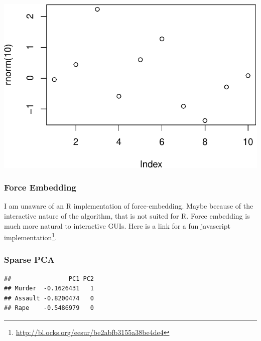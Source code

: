 \documentclass[]{book}
\newenvironment{Shaded}{\begin{snugshade}}{\end{snugshade}}
\newcommand{\CommentTok}[1]{\textcolor[rgb]{0.56,0.35,0.01}{\textit{#1}}}
\newcommand{\DataTypeTok}[1]{\textcolor[rgb]{0.13,0.29,0.53}{#1}}
\newcommand{\DecValTok}[1]{\textcolor[rgb]{0.00,0.00,0.81}{#1}}
\newcommand{\FloatTok}[1]{\textcolor[rgb]{0.00,0.00,0.81}{#1}}
\newcommand{\KeywordTok}[1]{\textcolor[rgb]{0.13,0.29,0.53}{\textbf{#1}}}
\newcommand{\NormalTok}[1]{#1}
\newcommand{\OperatorTok}[1]{\textcolor[rgb]{0.81,0.36,0.00}{\textbf{#1}}}
\newcommand{\OtherTok}[1]{\textcolor[rgb]{0.56,0.35,0.01}{#1}}
\newcommand{\StringTok}[1]{\textcolor[rgb]{0.31,0.60,0.02}{#1}}
\renewcommand{\href}[2]{#2\footnote{\url{#1}}}
\theoremstyle{definition}
\theoremstyle{definition}
\theoremstyle{definition}
\theoremstyle{remark}
\begin{document}
\includegraphics[width=0.5\linewidth]{Rcourse_files/figure-latex/unnamed-chunk-258-1}

\hypertarget{force-embedding}{%
\subsubsection{Force Embedding}\label{force-embedding}}

I am unaware of an R implementation of force-embedding.
Maybe because of the interactive nature of the algorithm, that is not suited for R.
Force embedding is much more natural to interactive GUIs.
Here is a link for a fun \href{http://bl.ocks.org/eesur/be2abfb3155a38be4de4}{javascript implementation}.

\hypertarget{sparse-pca}{%
\subsubsection{Sparse PCA}\label{sparse-pca}}

\begin{Shaded}
\end{Shaded}

\begin{verbatim}
##                PC1 PC2
## Murder  -0.1626431   1
## Assault -0.8200474   0
## Rape    -0.5486979   0
\end{verbatim}
\end{document}
